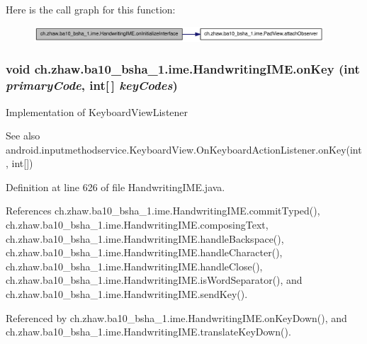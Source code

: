 Here is the call graph for this function:\nopagebreak
\begin{figure}[H]
\begin{center}
\leavevmode
\includegraphics[width=307pt]{classch_1_1zhaw_1_1ba10__bsha__1_1_1ime_1_1HandwritingIME_a113e6d863b481e5a9c926dd917d7822a_cgraph}
\end{center}
\end{figure}
\hypertarget{classch_1_1zhaw_1_1ba10__bsha__1_1_1ime_1_1HandwritingIME_a6bf7a6751794c5bf24f686cbf94d7ebf}{
\subsubsection[{onKey}]{\setlength{\rightskip}{0pt plus 5cm}void ch.zhaw.ba10\_\-bsha\_\-1.ime.HandwritingIME.onKey (int {\em primaryCode}, \/  int\mbox{[}$\,$\mbox{]} {\em keyCodes})}}
\label{classch_1_1zhaw_1_1ba10__bsha__1_1_1ime_1_1HandwritingIME_a6bf7a6751794c5bf24f686cbf94d7ebf}
Implementation of KeyboardViewListener \begin{DoxySeeAlso}{See also}
android.inputmethodservice.KeyboardView.OnKeyboardActionListener.onKey(int, int\mbox{[}\mbox{]}) 
\end{DoxySeeAlso}


Definition at line 626 of file HandwritingIME.java.

References ch.zhaw.ba10\_\-bsha\_\-1.ime.HandwritingIME.commitTyped(), ch.zhaw.ba10\_\-bsha\_\-1.ime.HandwritingIME.composingText, ch.zhaw.ba10\_\-bsha\_\-1.ime.HandwritingIME.handleBackspace(), ch.zhaw.ba10\_\-bsha\_\-1.ime.HandwritingIME.handleCharacter(), ch.zhaw.ba10\_\-bsha\_\-1.ime.HandwritingIME.handleClose(), ch.zhaw.ba10\_\-bsha\_\-1.ime.HandwritingIME.isWordSeparator(), and ch.zhaw.ba10\_\-bsha\_\-1.ime.HandwritingIME.sendKey().

Referenced by ch.zhaw.ba10\_\-bsha\_\-1.ime.HandwritingIME.onKeyDown(), and ch.zhaw.ba10\_\-bsha\_\-1.ime.HandwritingIME.translateKeyDown().

